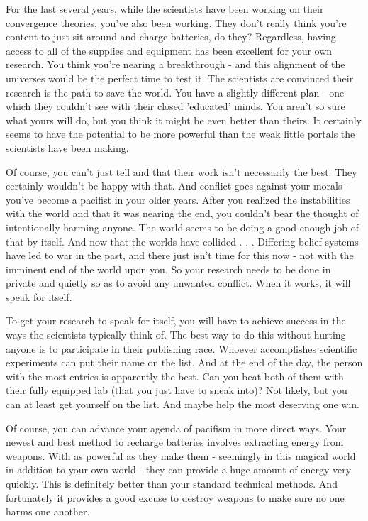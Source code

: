\documentclass[char]{guildcamp3}
\begin{document}
For the last several years, while the scientists have been working on their convergence theories, you've also been working. They don't really think you're content to just sit around and charge batteries, do they? Regardless, having access to all of the supplies and equipment has been excellent for your own research. You think you're nearing a breakthrough - and this alignment of the universes would be the perfect time to test it. The scientists are convinced their research is the path to save the world. You have a slightly different plan - one which they couldn't see with their closed 'educated' minds. You aren't so sure what yours will do, but you think it might be even better than theirs. It certainly seems to have the potential to be more powerful than the weak little portals the scientists have been making. 

Of course, you can't just tell \cSciOne{\informal} and \cSciTwo{\informal} that their work isn't necessarily the best. They certainly wouldn't be happy with that. And conflict goes against your morals - you've become a pacifist in your older years. After you realized the instabilities with the world and that it was nearing the end, you couldn't bear the thought of intentionally harming anyone. The world seems to be doing a good enough job of that by itself. And now that the worlds have collided . . . Differing belief systems have led to war in the past, and there just isn't time for this now - not with the imminent end of the world upon you. So your research needs to be done in private and quietly so as to avoid any unwanted conflict. When it works, it will speak for itself. 

To get your research to speak for itself, you will have to achieve success in the ways the scientists typically think of. The best way to do this without hurting anyone is to participate in their publishing race. Whoever accomplishes scientific experiments can put their name on the list. And at the end of the day, the person with the most entries is apparently the best. Can you beat both of them with their fully equipped lab (that you just have to sneak into)? Not likely, but you can at least get yourself on the list. And maybe help the most deserving one win.

Of course, you can advance your agenda of pacifism in more direct ways. Your newest and best method to recharge batteries involves extracting energy from weapons. With as powerful as they make them - seemingly in this magical world in addition to your own world - they can provide a huge amount of energy very quickly. This is definitely better than your standard technical methods. And fortunately it provides a good excuse to destroy weapons to make sure no one harms one another.
\end{document}

